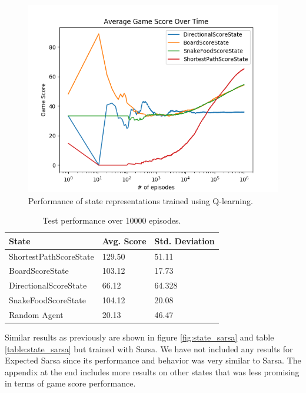 \documentclass[result.tex]{subfiles}
\begin{document}
    \begin{figure}[ht]
        \centering
        \includegraphics[width=\linewidth]{../images/qlearning/state/42/state_qlearning_average_game_score_over_time.png}
        \caption{Performance of state representations trained using Q-learning.}
        \label{fig:state_qlearning}
    \end{figure}

    \begin{table}[ht]
        \centering
        \begin{tabular}{ | l | l | l | }
            \hline
            State & Avg. Score & Std. Deviation \\ \hline
            ShortestPathScoreState & 129.50 & 51.11 \\ \hline
            BoardScoreState & 103.12 & 17.73 \\ \hline
            DirectionalScoreState & 66.12 & 64.328 \\ \hline
            SnakeFoodScoreState & 104.12 & 20.08 \\ \hline
            Random Agent & 20.13 & 46.47 \\
            \hline
        \end{tabular}
        \caption{Test performance over 10000 episodes.}
        \label{table:state_qlearning}
    \end{table}

    \newpage

    Similar results as previously are shown in figure \ref{fig:state_sarsa} and table \ref{table:state_sarsa} but trained with Sarsa. We have not included any results for Expected Sarsa since its performance and behavior was very similar to Sarsa. The appendix at the end includes more results on other states that was less promising in terms of game score performance.
\end{document}
